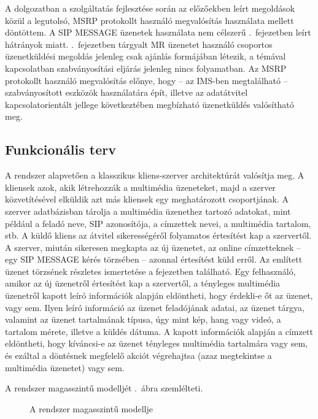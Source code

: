 \medskip

A dolgozatban a szolgáltatás fejlesztése során az előzőekben leírt megoldások közül a legutolsó, MSRP protokollt használó megvalósítás használata mellett döntöttem. A SIP MESSAGE üzenetek használata nem célszerű .~fejezetben leírt hátrányok miatt. .~fejezetben tárgyalt MR üzenetet használó csoportos üzenetküldési megoldás jelenleg csak ajánlás formájában létezik, a témával kapcsolatban szabványosítási eljárás jelenleg nincs folyamatban. Az MSRP protokollt használó megvalósítás előnye, hogy -- az IMS-ben megtalálható -- szabványosított eszközök használatára épít, illetve az adatátvitel kapcsolatorientált jellege következtében megbízható üzenetküldés valósítható meg. 

\subsection{Funkcionális terv}

A rendszer alapvetően a klasszikus kliens-szerver architektúrát valósítja meg. A kliensek azok, akik létrehozzák a multimédia üzeneteket, majd a szerver közvetítésével elküldik azt más kliensek egy meghatározott csoportjának. A szerver adatbázisban tárolja a multimédia üzenethez tartozó adatokat, mint például a feladó neve, SIP azonosítója, a címzettek nevei, a multimédia tartalom, stb. A küldő kliens az átvitel sikerességéről folyamatos értesítést kap a szervertől. A szerver, miután sikeresen megkapta az új üzenetet, az online címzetteknek -- egy SIP MESSAGE kérés törzsében -- azonnal értesítést küld erről. Az említett üzenet törzsének részletes ismertetése a  fejezetben található. Egy felhasználó, amikor az új üzenetről értesítést kap a szervertől, a tényleges multimédia üzenetről kapott leíró információk alapján eldöntheti, hogy érdekli-e őt az üzenet, vagy sem. Ilyen leíró információ az üzenet feladójának adatai, az üzenet tárgya, valamint az üzenet tartalmának típusa, úgy mint kép, hang vagy videó, a tartalom mérete, illetve a küldés dátuma. A kapott információk alapján a címzett eldöntheti, hogy kíváncsi-e az üzenet tényleges multimédia tartalmára vagy sem, és ezáltal a döntésnek megfelelő akciót végrehajtsa (azaz megtekintse a multimédia üzenetet) vagy sem. 

A rendszer magasszintű modelljét .~ábra szemlélteti.

\begin{figure}[htbp]
\center
{}
\caption{A rendszer magasszintű modellje}
\label{fig:model}
\end{figure}

